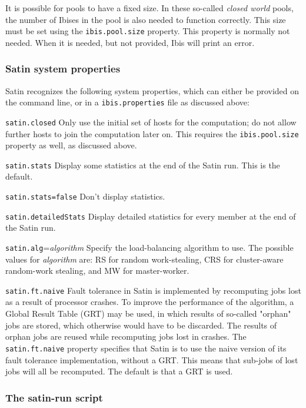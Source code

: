 \documentclass[a4paper,10pt]{article}
\begin{document}
It is possible for pools to have a fixed size. In these so-called \emph{closed
world} pools, the number of Ibises in the pool is also needed to function
correctly. This size must be set using the \texttt{ibis.pool.size} property.
This property is normally not needed. When it is needed, but not provided, Ibis
will print an error. 

\subsubsection{Satin system properties}

Satin recognizes the following system properties, which can either
be provided on the command line, or in a \texttt{ibis.properties} file
as discussed above:
\begin{description}
\item{\texttt{satin.closed}}
Only use the initial set of hosts for the computation; do not allow
further hosts to join the computation later on. This requires the
\texttt{ibis.pool.size} property as well, as discussed above.
\item{\texttt{satin.stats}}
Display some statistics at the end of the Satin run. This is the default.
\item{\texttt{satin.stats=false}}
Don't display statistics.
\item{\texttt{satin.detailedStats}}
Display detailed statistics for every member at the end of the Satin run.
\item{\texttt{satin.alg}=\emph{algorithm}}
Specify the load-balancing algorithm to use. The possible values for
\emph{algorithm} are: RS for random work-stealing, CRS for cluster-aware
random-work stealing, and MW for master-worker.
\item{\texttt{satin.ft.naive}}
Fault tolerance in Satin is implemented by recomputing jobs lost as a
result of processor crashes.
To improve the performance of the
algorithm, a Global Result Table (GRT) may be used, in which results of
so-called "orphan" jobs are stored, which otherwise would have to be discarded.
The results of orphan jobs are reused while recomputing jobs lost in
crashes. The \texttt{satin.ft.naive} property specifies that Satin is
to use the naive version of its fault tolerance implementation, without
a GRT. This means that sub-jobs of lost jobs will all be recomputed.
The default is that a GRT is used.
\end{description}

\subsubsection{The satin-run script}
\end{document}
